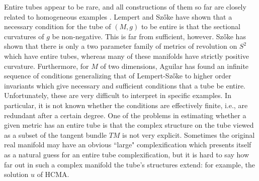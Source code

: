 \documentclass[12pt,reqno]{amsart}\usepackage{amssymb,amsmath,amscd,epsfig,amsthm,enumerate,import,eufrak}
\theoremstyle{definition}
\theoremstyle{remark}
\numberwithin{equation}{section}
\theoremstyle{plain}
\theoremstyle{definition}
\def \vs {\vskip 2mm}
\theoremstyle{remark}
\numberwithin{theorem}{section}
\begin{document}
\vs

Entire tubes appear to be rare, and all constructions of them so far are closely related to homogeneous examples \cite{a1, s}. Lempert and Sz\H{o}ke \cite{ls} have shown that a necessary condition for the tube of $(M, g)$ to be entire is that the sectional curvatures of $g$ be non-negative. This is far from sufficient, however. Sz\H{o}ke has shown that there is only a two parameter family of metrics of revolution on $S^2$ which have entire tubes, whereas many of these manifolds have strictly positive curvature. Furthermore, for $M$ of two dimensions, Aguilar \cite{a2} has found an infinite sequence of conditions generalizing that of Lempert-Sz\H{o}ke to higher order invariants which give necessary and sufficient conditions that a tube be entire. Unfortunately, these are very difficult to interpret in specific examples. In particular, it is not known whether the conditions are effectively finite, i.e., are redundant after a certain degree. One of the problems in estimating whether a given metric has an entire tube is that the complex structure on the tube viewed as a subset of the tangent bundle $TM$ is not very explicit. Sometimes the original real manifold may have an obvious ``large" complexification which presents itself as a natural guess for an entire tube complexification, but it is hard to say how far out in such a complex manifold the tube's structures extend: for example, the solution $u$ of HCMA. 

\vs
\end{document}
